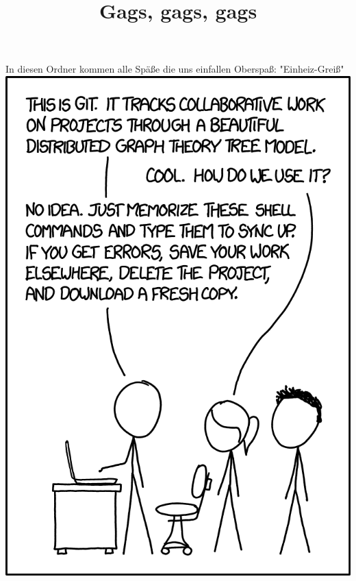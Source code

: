 ﻿\documentclass{article}
\title{Gags, gags, gags}
\begin{document}
\maketitle

In diesen Ordner kommen alle Späße die uns einfallen
Oberspaß: "Einheiz-Greiß"
\includegraphics[width=0.5\linewidth]{git_2x.png}
\end{document}
